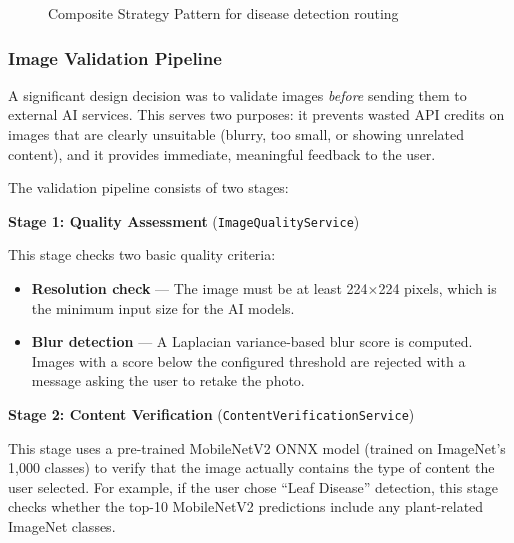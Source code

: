 \begin{figure}[H]
    \centering
    \caption{Composite Strategy Pattern for disease detection routing}
    \label{fig:composite_pattern}
\end{figure}

\subsubsection{Image Validation Pipeline}

A significant design decision was to validate images \textit{before} sending them to external AI services. This serves two purposes: it prevents wasted API credits on images that are clearly unsuitable (blurry, too small, or showing unrelated content), and it provides immediate, meaningful feedback to the user.

The validation pipeline consists of two stages:

\textbf{Stage 1: Quality Assessment} (\texttt{ImageQualityService})

This stage checks two basic quality criteria:
\begin{itemize}
    \item \textbf{Resolution check} --- The image must be at least 224$\times$224 pixels, which is the minimum input size for the AI models.
    \item \textbf{Blur detection} --- A Laplacian variance-based blur score is computed. Images with a score below the configured threshold are rejected with a message asking the user to retake the photo.
\end{itemize}

\textbf{Stage 2: Content Verification} (\texttt{ContentVerificationService})

This stage uses a pre-trained MobileNetV2 ONNX model (trained on ImageNet's 1,000 classes) to verify that the image actually contains the type of content the user selected. For example, if the user chose ``Leaf Disease'' detection, this stage checks whether the top-10 MobileNetV2 predictions include any plant-related ImageNet classes.


